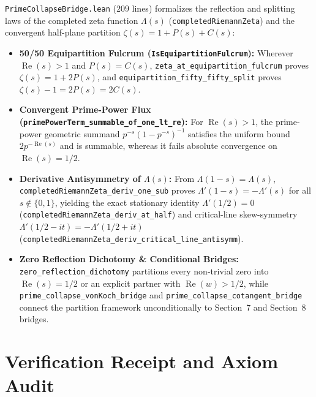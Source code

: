 \documentclass[11pt,a4paper]{article}
\theoremstyle{definition}
\begin{document}
\texttt{PrimeCollapseBridge.lean} ($209$ lines) formalizes the reflection and splitting laws of the completed zeta function $\Lambda(s)$ (\texttt{completedRiemannZeta}) and the convergent half-plane partition $\zeta(s) = 1 + P(s) + C(s)$:
\begin{itemize}[noitemsep]
  \item \textbf{50/50 Equipartition Fulcrum (\texttt{IsEquipartitionFulcrum}):} Wherever $\operatorname{Re}(s) > 1$ and $P(s) = C(s)$, \texttt{zeta\_\allowbreak at\_\allowbreak equipartition\_\allowbreak fulcrum} proves $\zeta(s) = 1 + 2P(s)$, and \texttt{equipartition\_\allowbreak fifty\_\allowbreak fifty\_\allowbreak split} proves $\zeta(s) - 1 = 2P(s) = 2C(s)$.
  \item \textbf{Convergent Prime-Power Flux (\texttt{primePowerTerm\_\allowbreak summable\_\allowbreak of\_\allowbreak one\_\allowbreak lt\_\allowbreak re}):} For $\operatorname{Re}(s) > 1$, the prime-power geometric summand $p^{-s}(1 - p^{-s})^{-1}$ satisfies the uniform bound $2 p^{-\operatorname{Re}(s)}$ and is summable, whereas it fails absolute convergence on $\operatorname{Re}(s) = 1/2$.
  \item \textbf{Derivative Antisymmetry of $\Lambda(s)$:} From $\Lambda(1-s) = \Lambda(s)$, \texttt{completedRiemannZeta\_\allowbreak deriv\_\allowbreak one\_\allowbreak sub} proves $\Lambda'(1 - s) = -\Lambda'(s)$ for all $s \notin \{0, 1\}$, yielding the exact stationary identity $\Lambda'(1/2) = 0$ (\texttt{completedRiemannZeta\_\allowbreak deriv\_\allowbreak at\_\allowbreak half}) and critical-line skew-symmetry $\Lambda'(1/2 - it) = -\Lambda'(1/2 + it)$ (\texttt{completedRiemannZeta\_\allowbreak deriv\_\allowbreak critical\_\allowbreak line\_\allowbreak antisymm}).
  \item \textbf{Zero Reflection Dichotomy \& Conditional Bridges:} \texttt{zero\_\allowbreak reflection\_\allowbreak dichotomy} partitions every non-trivial zero into $\operatorname{Re}(s) = 1/2$ or an explicit partner with $\operatorname{Re}(w) > 1/2$, while \texttt{prime\_\allowbreak collapse\_\allowbreak vonKoch\_\allowbreak bridge} and \texttt{prime\_\allowbreak collapse\_\allowbreak cotangent\_\allowbreak bridge} connect the partition framework unconditionally to Section~7 and Section~8 bridges.
\end{itemize}

\section{Verification Receipt and Axiom Audit}
\end{document}
